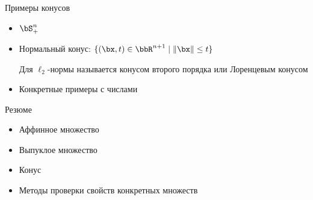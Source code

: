 \documentclass[12pt,russian]{beamer}
\begin{document}
\begin{frame}{Примеры конусов}
\begin{itemize}
\item $\bS^n_+$
\item Нормальный конус: $\{ (\bx, t) \in \bbR^{n+1} \; | \; \| \bx \| \leq t \}$ 

Для $\ell_2$-нормы называется конусом второго порядка или Лоренцевым конусом
\item Конкретные примеры с числами
\end{itemize}
\end{frame}

\begin{frame}{Резюме}
\begin{itemize}
\item Аффинное множество
\item Выпуклое множество
\item Конус
\item Методы проверки свойств конкретных множеств
\end{itemize}
\end{frame}
\end{document}
